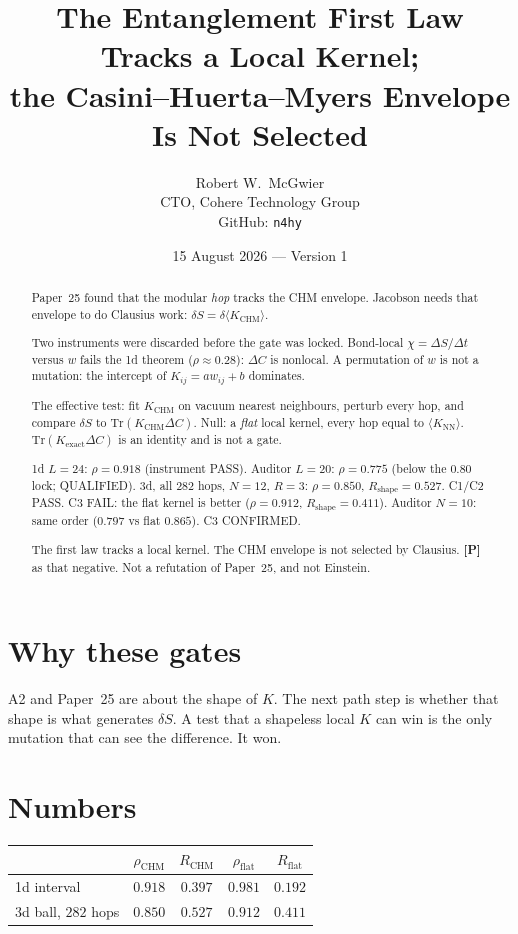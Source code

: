 \documentclass[11pt]{article}
\title{\textbf{The Entanglement First Law Tracks a Local Kernel;\\
the Casini--Huerta--Myers Envelope Is Not Selected}}
\author{Robert W.\ McGwier\\
\small CTO, Cohere Technology Group\\
\small GitHub: \texttt{n4hy}}
\date{15 August 2026 --- Version 1}
\newcommand{\pP}{\textbf{[P]}}
\begin{document}
\maketitle

\begin{abstract}
\noindent
Paper~25 found that the modular \emph{hop} tracks the CHM envelope.
Jacobson needs that envelope to do Clausius work:
$\delta S=\delta\langle K_{\mathrm{CHM}}\rangle$.

Two instruments were discarded before the gate was locked.
Bond-local $\chi=\Delta S/\Delta t$ versus $w$ fails the 1d theorem
($\rho\approx 0.28$): $\Delta C$ is nonlocal. A permutation of $w$
is not a mutation: the intercept of $K_{ij}=aw_{ij}+b$ dominates.

The effective test: fit $K_{\mathrm{CHM}}$ on vacuum nearest
neighbours, perturb every hop, and compare $\delta S$ to
$\mathrm{Tr}(K_{\mathrm{CHM}}\Delta C)$. Null: a \emph{flat} local
kernel, every hop equal to $\langle K_{\mathrm{NN}}\rangle$.
$\mathrm{Tr}(K_{\mathrm{exact}}\Delta C)$ is an identity and is
not a gate.

1d $L=24$: $\rho=0.918$ (instrument PASS). Auditor $L=20$:
$\rho=0.775$ (below the $0.80$ lock; QUALIFIED).
3d, all $282$ hops, $N=12$, $R=3$: $\rho=0.850$,
$R_{\mathrm{shape}}=0.527$. C1/C2 PASS.
C3 FAIL: the flat kernel is better ($\rho=0.912$,
$R_{\mathrm{shape}}=0.411$). Auditor $N=10$: same order
($0.797$ vs flat $0.865$). C3 CONFIRMED.

The first law tracks a local kernel. The CHM envelope is not
selected by Clausius. \pP{} as that negative. Not a refutation of
Paper~25, and not Einstein.
\end{abstract}

\section{Why these gates}

A2 and Paper~25 are about the shape of $K$. The next path step is
whether that shape is what generates $\delta S$. A test that a
shapeless local $K$ can win is the only mutation that can see the
difference. It won.

\section{Numbers}

\begin{center}
\begin{tabular}{lcccc}
\hline
 & $\rho_{\mathrm{CHM}}$ & $R_{\mathrm{CHM}}$ & $\rho_{\mathrm{flat}}$ & $R_{\mathrm{flat}}$ \\
\hline
1d interval & $0.918$ & $0.397$ & $0.981$ & $0.192$ \\
3d ball, $282$ hops & $0.850$ & $0.527$ & $0.912$ & $0.411$ \\
\hline
\end{tabular}
\end{center}
\end{document}
